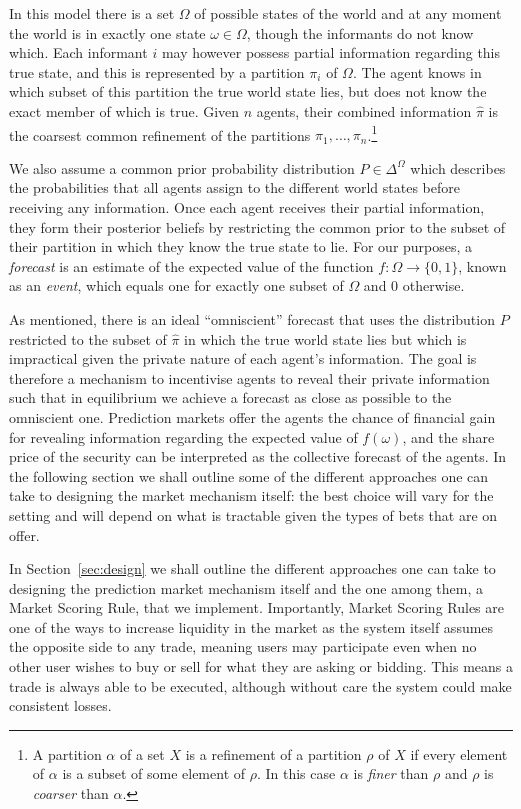 In this model there is a set $\Omega$ of possible states of the world and at
any moment the world is in exactly one state $\omega \in \Omega$, though the
informants do not know which. Each informant $i$ may however possess partial
information regarding this true state, and this is represented by a partition
$\pi_i$ of $\Omega$. The agent knows in which subset of this partition the true
world state lies, but does not know the exact member of which is true. Given
$n$ agents, their combined information $\hat{\pi}$ is the coarsest common
refinement of the partitions $\pi_1, \ldots, \pi_n$.\footnote{A partition
$\alpha$ of a set $X$ is a refinement of a partition $\rho$ of $X$ if every
element of $\alpha$ is a subset of some element of $\rho$. In this case
$\alpha$ is \emph{finer} than $\rho$ and $\rho$ is \emph{coarser} than
$\alpha$.}

We also assume a common prior probability distribution $P \in \Delta^{\Omega}$
which describes the probabilities that all agents assign to the different world
states before receiving any information. Once each agent receives their partial
information, they form their posterior beliefs by restricting the common prior
to the subset of their partition in which they know the true state to lie. For
our purposes, a \emph{forecast} is an estimate of the expected value of the
function $f : \Omega \rightarrow \{0,1\}$, known as an \emph{event}, which
equals one for exactly one subset of $\Omega$ and 0 otherwise.

As mentioned, there is an ideal ``omniscient'' forecast that uses the
distribution $P$ restricted to the subset of $\hat{\pi}$ in which the true
world state lies but which is impractical given the private nature of each
agent's information. The goal is therefore a mechanism to incentivise agents to
reveal their private information such that in equilibrium we achieve a forecast
as close as possible to the omniscient one. Prediction markets offer the agents
the chance of financial gain for revealing information regarding the expected
value of $f(\omega)$, and the share price of the security can be interpreted as
the collective forecast of the agents. In the following section we shall
outline some of the different approaches one can take to designing the market
mechanism itself: the best choice will vary for the setting and will depend on
what is tractable given the types of bets that are on offer.

In Section~\ref{sec:design} we shall
outline the different approaches one can take to designing the prediction
market mechanism itself and the one among them, a Market Scoring Rule, that we
implement. Importantly, Market Scoring Rules are one of the ways to increase
liquidity in the market as the system itself assumes the opposite side to any
trade, meaning users may participate even when no other user wishes to buy or
sell for what they are asking or bidding. This means a trade is always able to
be executed, although without care the system could make consistent losses.

